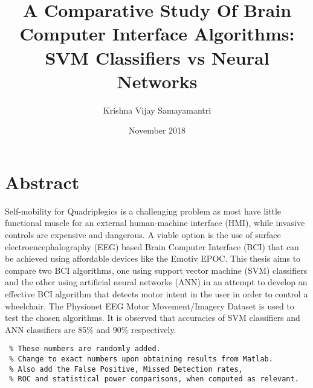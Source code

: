 \documentclass{article}
\title{A Comparative Study Of Brain Computer Interface Algorithms: SVM Classifiers vs Neural Networks}
\author{Krishna Vijay Samayamantri}
\date{November 2018}
\begin{document}
\maketitle

\section{Abstract}
Self-mobility for Quadriplegics is a challenging problem as most have little functional muscle for an external human-machine interface (HMI), while invasive controls are expensive and dangerous. A viable option is the use of surface electroencephalography (EEG) based Brain Computer Interface (BCI) that can be achieved using affordable devices like the Emotiv EPOC.
This thesis aims to compare two BCI algorithms, one using support vector machine (SVM) classifiers and the other using  artificial neural networks (ANN) in an attempt to develop an effective BCI algorithm that detects motor intent in the user in order to control a wheelchair.
The Physionet EEG Motor Movement/Imagery Dataset is used to test the chosen algorithms. It is observed that accuracies of SVM classifiers and ANN classifiers are 85\% and 90\% respectively. 
\begin{verbatim}
 % These numbers are randomly added. 
 % Change to exact numbers upon obtaining results from Matlab. 
 % Also add the False Positive, Missed Detection rates, 
 % ROC and statistical power comparisons, when computed as relevant.
\end{verbatim}
\end{document}

